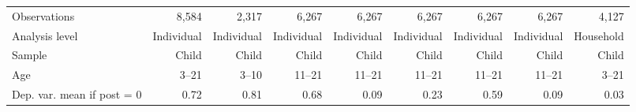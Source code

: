 \begin{center}
\begin{threeparttable}
\begin{tabular}{l*{8}{r}}
Observations        &       8,584&       2,317&       6,267&       6,267&       6,267&       6,267&       6,267&       4,127\\
Analysis level      &  Individual&  Individual&  Individual&  Individual&  Individual&  Individual&  Individual&   Household\\
Sample              &       Child&       Child&       Child&       Child&       Child&       Child&       Child&       Child\\
Age                 &       3--21&       3--10&      11--21&      11--21&      11--21&      11--21&      11--21&       3--21\\
Dep. var. mean if post = 0&        0.72&        0.81&        0.68&        0.09&        0.23&        0.59&        0.09&        0.03\\
\hline \end{tabular} \end{threeparttable} \end{center}
